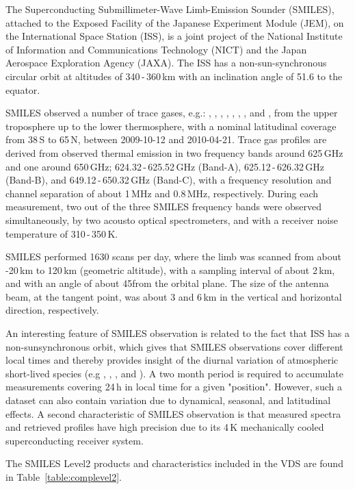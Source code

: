 The Superconducting Submillimeter-Wave Limb-Emission Sounder (SMILES),
attached to the Exposed Facility of the Japanese Experiment Module (JEM), 
on the International Space Station (ISS), is a joint project of the
National Institute of Information and Communications Technology (NICT) and
the Japan Aerospace Exploration Agency (JAXA).
The ISS has a non-sun-synchronous circular orbit at
altitudes of 340\,-\,360\,km with an inclination angle of 51.6\degree
to the equator. 

SMILES observed a number of trace gases, e.g.: , , 
, , , , , and , 
from the upper troposphere up to the lower thermosphere,  
with a nominal latitudinal coverage 
from 38\degree\,S to 65\degree\,N, between 2009-10-12 and 2010-04-21.
Trace gas profiles are derived from observed thermal emission in two frequency
bands around 625\,GHz and one around 650\,GHz;
624.32\,-\,625.52\,GHz (Band-A), 625.12\,-\,626.32\,GHz (Band-B),
and 649.12\,-\,650.32\,GHz (Band-C), with a frequency resolution
and channel separation of about 1\,MHz and 0.8\,MHz, 
respectively.  
During each measurement, two out of the three SMILES frequency
bands were observed simultaneously, by two acousto optical spectrometers,
and with a receiver noise temperature of 310\,-\,350\,K.

SMILES performed 1630 scans per day, where the limb was scanned
from about -20\,km to 120\,km (geometric altitude), 
with a sampling interval of about 2\,km, and with an angle of 
about 45\degree from the orbital plane. The size of the antenna beam, 
at the tangent point, was about 3 and 6\,km in the vertical and 
horizontal direction, respectively. 

An interesting feature of SMILES observation is related to the fact
that ISS has a non-sunsynchronous orbit, which gives that SMILES 
observations cover different local times and thereby provides insight
of the diurnal variation of atmospheric short-lived species
(e.g , , , and ). 
A two month period is required to accumulate measurements covering 
24\,h in local time for a given "position". However, such a 
dataset can also contain variation due to dynamical, seasonal, and 
latitudinal effects.
A second characteristic of SMILES observation is that 
measured spectra and retrieved profiles have high precision due 
to its 4\,K mechanically cooled superconducting receiver system.

The SMILES Level2 products and characteristics included in the
VDS are found in Table~\ref{table:complevel2}.



